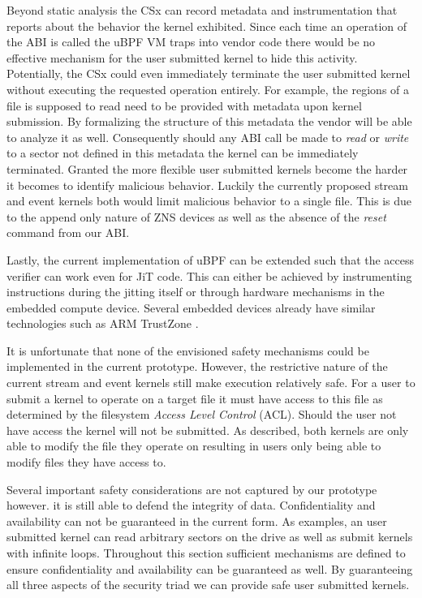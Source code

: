 Beyond static analysis the CSx can record metadata and instrumentation that
reports about the behavior the kernel exhibited. Since each time an operation of
the ABI is called the uBPF VM traps into vendor code there would be no effective
mechanism for the user submitted kernel to hide this activity. Potentially, the
CSx could even immediately terminate the user submitted kernel without
executing the requested operation entirely. For example, the regions of a file
is supposed to read need to be provided with metadata upon kernel submission.
By formalizing the structure of this metadata the vendor will be able to analyze
it as well. Consequently should any ABI call be made to \textit{read} or
\textit{write} to a sector not defined in this metadata the kernel can be
immediately terminated. Granted the more flexible user submitted kernels become
the harder it becomes to identify malicious behavior. Luckily the currently
proposed stream and event kernels both would limit malicious behavior to a
single file. This is due to the append only nature of ZNS devices as well as the
absence of the \textit{reset} command from our ABI.

Lastly, the current implementation of uBPF can be extended such that the access
verifier can work even for JiT code. This can either be achieved by
instrumenting instructions during the jitting itself or through hardware
mechanisms in the embedded compute device. Several embedded devices already have
similar technologies such as ARM TrustZone \cite{Pinto2019DemystifyingAT}.

It is unfortunate that none of the envisioned safety mechanisms could be
implemented in the current prototype. However, the restrictive nature of the
current stream and event kernels still make execution relatively safe. For a
user to submit a kernel to operate on a target file it must have access to this
file as determined by the filesystem \textit{Access Level Control} (ACL).
Should the user not have access the kernel will not be submitted. As described,
both kernels are only able to modify the file they operate on resulting in users
only being able to modify files they have access to.

Several important safety considerations are not captured by our prototype
however. it is still able to defend the integrity of data. Confidentiality and
availability can not be guaranteed in the current form. As examples, an user
submitted kernel can read arbitrary sectors on the drive as well as submit
kernels with infinite loops. Throughout this section sufficient mechanisms are
defined to ensure confidentiality and availability can be guaranteed as well.
By guaranteeing all three aspects of the security triad we can provide safe
user submitted kernels.

